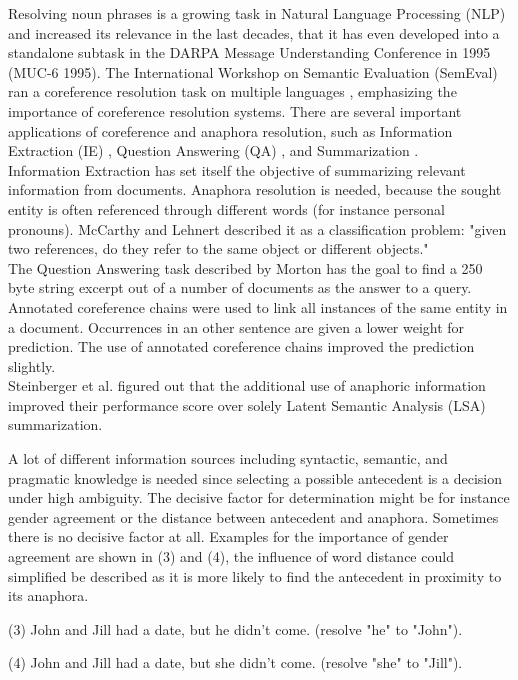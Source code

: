 Resolving noun phrases is a growing task in Natural Language Processing (NLP) and increased its relevance in the last decades, that it has even developed into a standalone subtask in the DARPA Message Understanding Conference in 1995 (MUC-6 1995). The International Workshop on Semantic Evaluation (SemEval) ran a coreference resolution task on multiple languages \citep{recasens2010semeval}, emphasizing the importance of coreference resolution systems. 
There are several important applications of coreference and anaphora resolution, such as Information Extraction (IE) \citep{mccarthy1995using}, Question Answering (QA) \citep{morton2000coreference}, and Summarization \citep{steinberger2007two}.\\ 
Information Extraction has set itself the objective of summarizing relevant information from documents. Anaphora resolution is needed, because the sought entity is often referenced through different words (for instance personal pronouns). McCarthy and Lehnert described it as a classification problem: "given two references, do they refer to the same object or different objects."\\
The Question Answering task described by Morton has the goal to find a 250 byte string excerpt out of a number of documents as the answer to a query. Annotated coreference chains were used to link all instances of the same entity in a document. Occurrences in an other sentence are given a lower weight for prediction. The use of annotated coreference chains improved the prediction slightly.\\
Steinberger et al. figured out that the additional use of anaphoric information improved their performance score over solely Latent Semantic Analysis (LSA) summarization.

A lot of different information sources including syntactic, semantic, and pragmatic knowledge is needed since selecting a possible antecedent is a decision under high ambiguity. The decisive factor for determination might be for instance gender agreement or the distance between antecedent and anaphora. Sometimes there is no decisive factor at all. Examples for the importance of gender agreement are shown in (3) and (4), the influence of word distance could simplified be described as it is more likely to find the antecedent in proximity to its anaphora.

(3) John and Jill had a date, but he didn't come. (resolve "he" to "John").

(4) John and Jill had a date, but she didn't come. (resolve "she" to "Jill").

